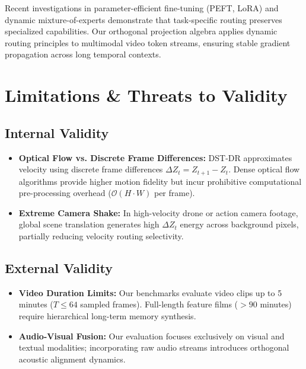 \documentclass{article}
\begin{document}
Recent investigations in parameter-efficient fine-tuning (PEFT, LoRA) and dynamic mixture-of-experts \cite{arxiv_2305_18290,arxiv_2412_06333} demonstrate that task-specific routing preserves specialized capabilities. Our orthogonal projection algebra applies dynamic routing principles to multimodal video token streams, ensuring stable gradient propagation across long temporal contexts.




\section{Limitations \& Threats to Validity}



\subsection{Internal Validity}

\begin{itemize}
  \item \textbf{Optical Flow vs. Discrete Frame Differences:} DST-DR approximates velocity using discrete frame differences $\Delta Z_t = Z_{t+1} - Z_t$. Dense optical flow algorithms provide higher motion fidelity but incur prohibitive computational pre-processing overhead ($\mathcal{O}(H \cdot W)$ per frame).
  \item \textbf{Extreme Camera Shake:} In high-velocity drone or action camera footage, global scene translation generates high $\Delta Z_t$ energy across background pixels, partially reducing velocity routing selectivity.
\end{itemize}


\subsection{External Validity}

\begin{itemize}
  \item \textbf{Video Duration Limits:} Our benchmarks evaluate video clips up to 5 minutes ($T \le 64$ sampled frames). Full-length feature films ($>90$ minutes) require hierarchical long-term memory synthesis.
  \item \textbf{Audio-Visual Fusion:} Our evaluation focuses exclusively on visual and textual modalities; incorporating raw audio streams introduces orthogonal acoustic alignment dynamics.
\end{itemize}
\end{document}
